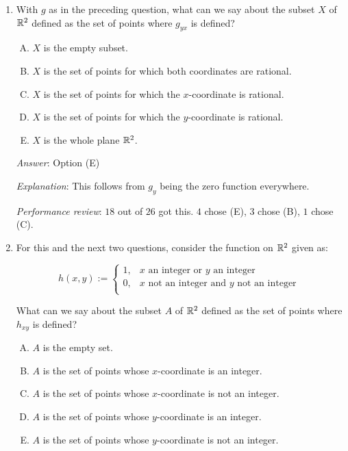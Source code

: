 \documentclass[10pt]{amsart}
\begin{document}
\begin{enumerate}
  {\em Answer}: Option (A)

  {\em Explanation}: This follows from $g_x$ not being defined anywhere.

  {\em Performance review}: $18$ out of $26$ got this. $4$ chose (B),
  $2$ chose (E), $1$ each chose (C) and (D).

\item With $g$ as in the preceding question, what can we say about the
  subset $X$ of $\mathbb{R}^2$ defined as the set of points where $g_{yx}$ is
  defined?

  \begin{enumerate}[(A)]
  \item $X$ is the empty subset.
  \item $X$ is the set of points for which both coordinates are rational.
  \item $X$ is the set of points for which the $x$-coordinate is rational.
  \item $X$ is the set of points for which the $y$-coordinate is rational.
  \item $X$ is the whole plane $\mathbb{R}^2$.
  \end{enumerate}

  {\em Answer}: Option (E)

  {\em Explanation}: This follows from $g_y$ being the zero function
  everywhere.

  {\em Performance review}: $18$ out of $26$ got this. $4$ chose (E),
  $3$ chose (B), $1$ chose (C).
\item For this and the next two questions, consider the function on
  $\mathbb{R}^2$ given as:

  $$h(x,y) := \left\lbrace \begin{array}{rl} 1, & x \text{ an integer or } y \text{ an integer }\\0, & x \text{ not an integer and } y \text{ not an integer } \\\end{array}\right.$$

  What can we say about the subset $A$ of $\mathbb{R}^2$ defined as the set of
  points where $h_{xy}$ is defined?

  \begin{enumerate}[(A)]
  \item $A$ is the empty set.
  \item $A$ is the set of points whose $x$-coordinate is an integer.
  \item $A$ is the set of points whose $x$-coordinate is not an integer.
  \item $A$ is the set of points whose $y$-coordinate is an integer.
  \item $A$ is the set of points whose $y$-coordinate is not an integer.
  \end{enumerate}


\end{enumerate}
\end{document}

